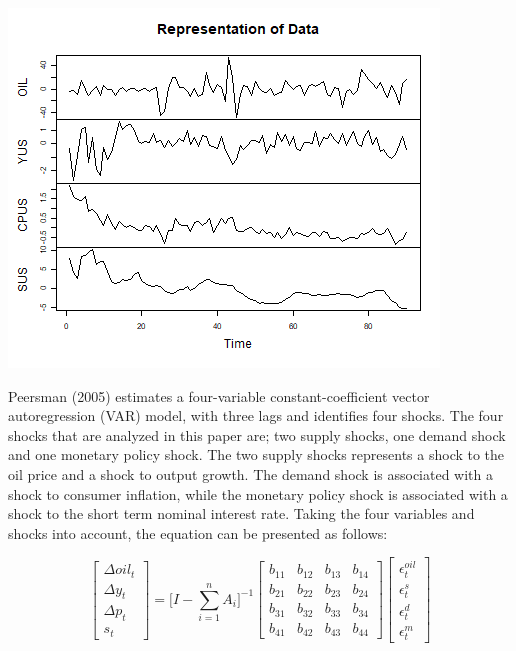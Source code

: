 \documentclass[11pt,preprint, authoryear]{elsarticle}
\let\origfigure\figure
\let\endorigfigure\endfigure
\renewenvironment{figure}[1][2] {
    \expandafter\origfigure\expandafter[H]
} {
    \endorigfigure
}
\numberwithin{equation}{section}
\numberwithin{figure}{section}
\numberwithin{table}{section}
\begin{document}
\begin{figure}[H]

{\centering \includegraphics{replication_files/figure-latex/Figure1-1} 

}

\caption{Data\label{Figure1}}\label{fig:Figure1}
\end{figure}

Peersman (2005) estimates a four-variable constant-coefficient vector
autoregression (VAR) model, with three lags and identifies four shocks.
The four shocks that are analyzed in this paper are; two supply shocks,
one demand shock and one monetary policy shock. The two supply shocks
represents a shock to the oil price and a shock to output growth. The
demand shock is associated with a shock to consumer inflation, while the
monetary policy shock is associated with a shock to the short term
nominal interest rate. Taking the four variables and shocks into
account, the equation can be presented as follows:

\[\begin{bmatrix} \Delta oil_t \\ \Delta y_t \\ \Delta p_t \\ s_t \end{bmatrix} = \Biggl[ I - \sum_{i=1}^{n} A_i \Biggl]^{-1} \begin{bmatrix} b_{11}& b_{12}& b_{13} & b_{14} \\
b_{21}& b_{22}& b_{23} & b_{24} \\
b_{31}& b_{32}& b_{33} & b_{34} \\
b_{41}& b_{42}& b_{43} & b_{44} \end{bmatrix} \begin{bmatrix} \epsilon_t^{oil} \\ \epsilon_t^{s} \\ \epsilon_t^{d} \\ \epsilon_t^{m} \end{bmatrix}\]
\end{document}
